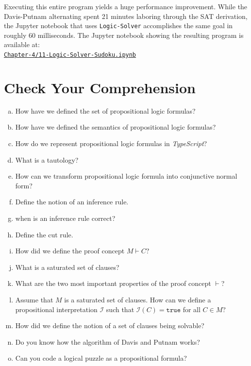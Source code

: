 Executing this entire program yields a huge performance improvement.  While the Davis-Putnam
alternating spent 21 minutes laboring through the SAT derivation, the Jupyter notebook that uses \texttt{Logic-Solver}
accomplishes the same goal in roughly 60 milliseconds.  
The Jupyter notebook showing the resulting program is available at:
\\[0.2cm]
\hspace*{1.3cm}
\href{https://github.com/karlstroetmann/Logic/blob/master/TypeScript/Chapter-4/11-Logic-Solver-Sudoku.ipynb}{\texttt{Chapter-4/11-Logic-Solver-Sudoku.ipynb}}
\pagebreak

\vspace*{\fill}
\pagebreak

\section{Check Your Comprehension}
\begin{enumerate}[(a)]
\item How have we defined the set of propositional logic formulas?
\item How have we defined the semantics of propositional logic formulas?
\item How do we represent propositional logic formulas in \textsl{TypeScript}?
\item What is a tautology?
\item How can we transform propositional logic formula into conjunctive normal
      form?
\item Define the notion of an inference rule.
\item when is  an inference rule correct?
\item Define the cut rule.
\item How did we define the proof concept $M \vdash C$?
\item What is a saturated set of clauses?
\item What are the two most important properties of the proof concept $\vdash$?
\item Assume that $M$ is a saturated set of clauses. How can we define a propositional interpretation
      $\mathcal{I}$ such that $\mathcal{I}(C) = \mathtt{true}$ for all $C \in M$?
\item How did we define the notion of a set of clauses being solvable?
\item Do you know how the algorithm of Davis and Putnam works?
\item Can you code a logical puzzle as a propositional formula?
\end{enumerate}


%

